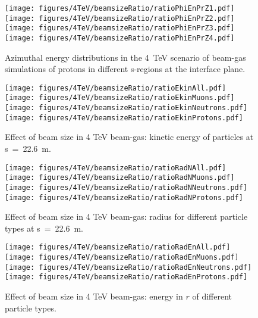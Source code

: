 \begin{figure}%
\begin{center}
  \texttt{[image: figures/4TeV/beamsizeRatio/ratioPhiEnPrZ1.pdf]}
  \texttt{[image: figures/4TeV/beamsizeRatio/ratioPhiEnPrZ2.pdf]}
  \texttt{[image: figures/4TeV/beamsizeRatio/ratioPhiEnPrZ3.pdf]}
  \texttt{[image: figures/4TeV/beamsizeRatio/ratioPhiEnPrZ4.pdf]}
\end{center}
\vspace{-0.6cm}
 \caption{Azimuthal energy distributions in the 4~TeV scenario of beam-gas simulations of protons in different s-regions at the interface plane.
  \label{bsZPr}}
\end{figure}

\begin{figure}%
\begin{center}
  \texttt{[image: figures/4TeV/beamsizeRatio/ratioEkinAll.pdf]}
  \texttt{[image: figures/4TeV/beamsizeRatio/ratioEkinMuons.pdf]}
  \texttt{[image: figures/4TeV/beamsizeRatio/ratioEkinNeutrons.pdf]}
  \texttt{[image: figures/4TeV/beamsizeRatio/ratioEkinProtons.pdf]}
\end{center}
\vspace{-0.6cm}
 \caption{Effect of beam size in 4 TeV beam-gas: kinetic energy of particles at s~=~22.6~m.
  \label{bsRatioEkin}}
\end{figure}

\begin{figure}%
\begin{center}
  \texttt{[image: figures/4TeV/beamsizeRatio/ratioRadNAll.pdf]}
  \texttt{[image: figures/4TeV/beamsizeRatio/ratioRadNMuons.pdf]}
  \texttt{[image: figures/4TeV/beamsizeRatio/ratioRadNNeutrons.pdf]}
  \texttt{[image: figures/4TeV/beamsizeRatio/ratioRadNProtons.pdf]}
\end{center}
\vspace{-0.6cm}
 \caption{Effect of beam size in 4 TeV beam-gas: radius for different particle types at s~=~22.6~m.
  \label{bsRatioRadN}}
\end{figure}

\begin{figure}%
\begin{center}
  \texttt{[image: figures/4TeV/beamsizeRatio/ratioRadEnAll.pdf]}
  \texttt{[image: figures/4TeV/beamsizeRatio/ratioRadEnMuons.pdf]}
  \texttt{[image: figures/4TeV/beamsizeRatio/ratioRadEnNeutrons.pdf]}
  \texttt{[image: figures/4TeV/beamsizeRatio/ratioRadEnProtons.pdf]}
\end{center}
\vspace{-0.6cm}
 \caption{Effect of beam size in 4 TeV beam-gas: energy in $r$ of different particle types.
  \label{bsRatioRadEn}}
\end{figure}


